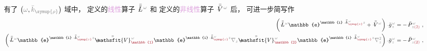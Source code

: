 有了 $\left( \mathcolor{gray}{\omega}, \mathcolor{gray}{\bar{k}_{\symup{\rho}}} \right)$ 域中，  定义的\textcolor{Plum}{线性}算子 $\Xint{\mathcolor{gray}{-}}{30}{\bar{\bar{L}}}^{\;\! \mathcolor{gray}{\omega}}$ 和  定义的\textcolor{Plum}{非线性}算子 $\Xint{\mathcolor{gray}{-}}{21}{\bar{\bar{V}}}^{\;\! \mathcolor{gray}{\omega}}$ 后， 可进一步简写作
\begin{subequations}
\begin{align}
	\left( \Xint{\mathcolor{gray}{-}}{32}{\bar{\bar{L}}}^{\;\! \mathcolor{gray}{\omega}} \mathbb{e}^{\mathbb{i} \Xint{\begin{smallmatrix} ~ \\ {}^{}_{\mathcolor{gray}{-}} \\ ~ \end{smallmatrix}}{15}{\bar{\bar{k}}}_{\textcolor{Maroon}{\symup{z}}}^{\;\! \mathcolor{gray}{\omega}} \mathcolor{gray}{z}} + \Xint{\mathcolor{gray}{-}}{25}{\bar{\bar{V}}}^{\;\! \mathcolor{gray}{\omega}} \right) \Xint{{}^{}_{\mathcolor{gray}{-}}}{10}{\bar{g}}^{\;\!\mathcolor{gray}{\omega}}_{\;\! \mathcolor{gray}{z}}
	&= - \Xint{\mathcolor{gray}{-}}{30}{\bar{P}}^{\;\! \mathcolor{gray}{\omega}}_{\;\! \mathcolor{gray}{z} \textcolor{Maroon}{(2)}} ~, \label{eq:nonlinear(2)-wave_wkrho-simplify6} \\
	\left( \Xint{\mathcolor{gray}{-}}{32}{\bar{\bar{L}}}^{\;\! \mathcolor{gray}{\omega}} \mathbb{e}^{\mathbb{i} \Xint{\begin{smallmatrix} ~ \\ {}^{}_{\mathcolor{gray}{-}} \\ ~ \end{smallmatrix}}{15}{\bar{\bar{k}}}_{\textcolor{Maroon}{\symup{z}}}^{\;\! \mathcolor{gray}{\omega}} \mathcolor{gray}{z}} + \Xint{\mathcolor{gray}{-}}{25}{\bar{\bar{\mathsfit{V}}}}^{\;\! \mathcolor{gray}{\omega}}_{\textcolor{Maroon}{\mathbb{1}}} \mathbb{e}^{\mathbb{i} \Xint{\begin{smallmatrix} ~ \\ {}^{}_{\mathcolor{gray}{-}} \\ ~ \end{smallmatrix}}{15}{\bar{\bar{k}}}_{\textcolor{Maroon}{\symup{z}}}^{\;\! \mathcolor{gray}{\omega}} \mathcolor{gray}{z}} \mathcolor{gray}{\nabla_z} + \Xint{\mathcolor{gray}{-}}{25}{\bar{\bar{\mathsfit{V}}}}^{\;\! \mathcolor{gray}{\omega}}_{\textcolor{Maroon}{\mathbb{2}}} \mathbb{e}^{\mathbb{i} \Xint{\begin{smallmatrix} ~ \\ {}^{}_{\mathcolor{gray}{-}} \\ ~ \end{smallmatrix}}{15}{\bar{\bar{k}}}_{\textcolor{Maroon}{\symup{z}}}^{\;\! \mathcolor{gray}{\omega}} \mathcolor{gray}{z}} \mathcolor{gray}{\nabla_z^2} \right) \Xint{{}^{}_{\mathcolor{gray}{-}}}{10}{\bar{g}}^{\;\!\mathcolor{gray}{\omega}}_{\;\! \mathcolor{gray}{z}}
	&= - \Xint{\mathcolor{gray}{-}}{30}{\bar{P}}^{\;\! \mathcolor{gray}{\omega}}_{\;\! \mathcolor{gray}{z} \textcolor{Maroon}{(2)}} ~, \label{eq:nonlinear(2)-wave_wkrho-simplify6-1st2nd-decompose}
\end{align}
\end{subequations}
